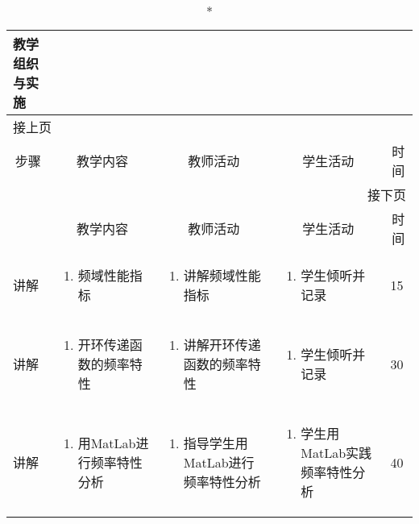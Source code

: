 {%
\begin{landscape}

\begin{longtable}{|m{10mm}|m{50mm}|m{50mm}|m{50mm}|m{15mm}|}
\caption*{\huge 教学组织与实施}\\
\hline
\endfirsthead
\multicolumn{5}{l}{\small 接上页}\\
\hline
\multicolumn{1}{|c|}{步骤}&\multicolumn{1}{c|}{教学内容}&\multicolumn{1}{c|}{教师活动}&\multicolumn{1}{c|}{学生活动}&\multicolumn{1}{c|}{时间}\\
\hline
\endhead

\multicolumn{5}{r}{\small 接下页}\\
\endfoot
\hline
\endlastfoot
\multicolumn{1}{|c|}{步骤}&\multicolumn{1}{c|}{教学内容}&\multicolumn{1}{c|}{教师活动}&\multicolumn{1}{c|}{学生活动}&\multicolumn{1}{c|}{时间}\\\hline
讲解&\begin{enumerate}
\item 频域性能指标
\end{enumerate} &\begin{enumerate}
\item 讲解频域性能指标
\end{enumerate} &\begin{enumerate}
\item 学生倾听并记录
\end{enumerate} &15 \\\hline
讲解&\begin{enumerate}
\item 开环传递函数的频率特性
\end{enumerate}
 &\begin{enumerate}
\item 讲解开环传递函数的频率特性
\end{enumerate} &\begin{enumerate}
\item 学生倾听并记录
\end{enumerate} &30 \\\hline
讲解&\begin{enumerate}
\item 用MatLab进行频率特性分析
\end{enumerate}
&\begin{enumerate}
\item 指导学生用MatLab进行频率特性分析
\end{enumerate} &\begin{enumerate}
\item 学生用MatLab实践频率特性分析
\end{enumerate} &40 \\\hline


\end{longtable}
\end{landscape}}
